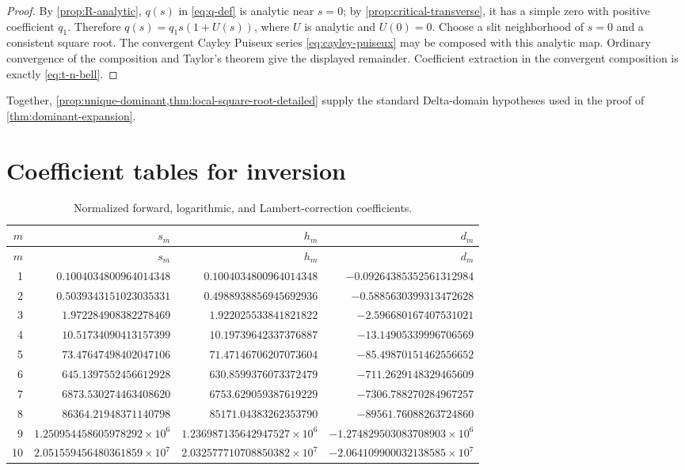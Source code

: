 \documentclass[11pt,oneside]{article}
\numberwithin{equation}{section}
\theoremstyle{plain}
\theoremstyle{definition}
\theoremstyle{remark}
\begin{document}
\begin{proof}
By \cref{prop:R-analytic}, $q(s)$ in \eqref{eq:q-def} is analytic near
$s=0$; by \cref{prop:critical-transverse}, it has a simple zero with positive
coefficient $q_1$.  Therefore $q(s)=q_1s(1+U(s))$, where $U$ is analytic and
$U(0)=0$.  Choose a slit neighborhood of $s=0$ and a consistent square root.
The convergent Cayley Puiseux series \eqref{eq:cayley-puiseux} may be
composed with this analytic map.  Ordinary convergence of the composition
and Taylor's theorem give the displayed remainder.  Coefficient extraction
in the convergent composition is exactly \eqref{eq:t-n-bell}.
\end{proof}

Together, \cref{prop:unique-dominant,thm:local-square-root-detailed} supply
the standard Delta-domain hypotheses used in the proof of
\cref{thm:dominant-expansion}.

\section{Coefficient tables for inversion}\label{app:inverse-tables}

\begingroup
\small
\begin{longtable}{@{}r@{\enspace}r@{\enspace}r@{\enspace}r@{}}
\caption{Normalized forward, logarithmic, and Lambert-correction
coefficients.}
\label{tab:inverse-coefficients}\\
\toprule
$m$ & $s_m$ & $h_m$ & $d_m$\\
\midrule
\endfirsthead
\toprule
$m$ & $s_m$ & $h_m$ & $d_m$\\
\midrule
\endhead
1 & $0.1004034800964014348$ & $0.1004034800964014348$ & $-0.09264385352561312984$\\
2 & $0.5039343151023035331$ & $0.4988938856945692936$ & $-0.5885630399313472628$\\
3 & $1.972284908382278469$ & $1.922025533841821822$ & $-2.596680167407531021$\\
4 & $10.51734090413157399$ & $10.19739642337376887$ & $-13.14905339996706569$\\
5 & $73.47647498402047106$ & $71.47146706207073604$ & $-85.49870151462556652$\\
6 & $645.1397552456612928$ & $630.8599376073372479$ & $-711.2629148329465609$\\
7 & $6873.530274463408620$ & $6753.629059387619229$ & $-7306.788270284967257$\\
8 & $86364.21948371140798$ & $85171.04383262353790$ & $-89561.76088263724860$\\
9 & $1.250954458605978292\times10^6$ & $1.236987135642947527\times10^6$ & $-1.274829503083708903\times10^6$\\
10 & $2.051559456480361859\times10^7$ & $2.032577710708850382\times10^7$ & $-2.064109900032138585\times10^7$\\
\bottomrule
\end{longtable}
\endgroup
\end{document}
